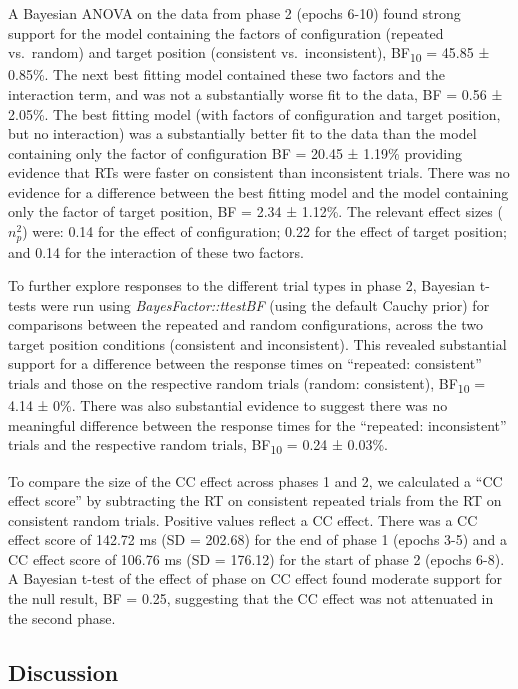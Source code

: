 \documentclass[
  man,
  floatsintext,
  longtable,
  nolmodern,
  notxfonts,
  notimes,
  colorlinks=true,linkcolor=blue,citecolor=blue,urlcolor=blue]{apa7}
\begin{document}
A Bayesian ANOVA on the data from phase 2 (epochs 6-10) found strong
support for the model containing the factors of configuration (repeated
vs.~random) and target position (consistent vs.~inconsistent),
BF\textsubscript{10} = 45.85 ± 0.85\%. The next best fitting model
contained these two factors and the interaction term, and was not a
substantially worse fit to the data, BF = 0.56 ± 2.05\%. The best
fitting model (with factors of configuration and target position, but no
interaction) was a substantially better fit to the data than the model
containing only the factor of configuration BF = 20.45 ± 1.19\%
providing evidence that RTs were faster on consistent than inconsistent
trials. There was no evidence for a difference between the best fitting
model and the model containing only the factor of target position, BF =
2.34 ± 1.12\%. The relevant effect sizes (\(n^2_p\)) were: 0.14 for the
effect of configuration; 0.22 for the effect of target position; and
0.14 for the interaction of these two factors.

To further explore responses to the different trial types in phase 2,
Bayesian t-tests were run using \emph{BayesFactor::ttestBF} (using the
default Cauchy prior) for comparisons between the repeated and random
configurations, across the two target position conditions (consistent
and inconsistent). This revealed substantial support for a difference
between the response times on ``repeated: consistent'' trials and those
on the respective random trials (random: consistent),
BF\textsubscript{10} = 4.14 ± 0\%. There was also substantial evidence
to suggest there was no meaningful difference between the response times
for the ``repeated: inconsistent'' trials and the respective random
trials, BF\textsubscript{10} = 0.24 ± 0.03\%.

To compare the size of the CC effect across phases 1 and 2, we
calculated a ``CC effect score'' by subtracting the RT on consistent
repeated trials from the RT on consistent random trials. Positive values
reflect a CC effect. There was a CC effect score of 142.72 ms (SD =
202.68) for the end of phase 1 (epochs 3-5) and a CC effect score of
106.76 ms (SD = 176.12) for the start of phase 2 (epochs 6-8). A
Bayesian t-test of the effect of phase on CC effect found moderate
support for the null result, BF = 0.25, suggesting that the CC effect
was not attenuated in the second phase.

\subsection{Discussion}\label{discussion}
\end{document}

